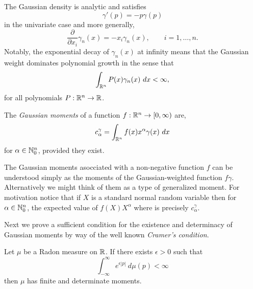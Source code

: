 The Gaussian density is analytic and satisfies
\[
  \gamma'(p) = -p\gamma(p)
\]
in the univariate case and more generally,
\[
  \frac{\partial}{\partial x_i} \gamma_n(x) = -x_i \gamma_n(x), \qquad i = 1, \ldots, n.
\]
Notably, the exponential decay of $\gamma_n(x)$ at infinity means that the Gaussian weight dominates polynomial growth in the sense that 
\[
  \int_{\mathbb{R}^n} P(x) \gamma_n(x) ~dx < \infty,
\]
for all polynomials $P : \mathbb{R}^n \to \mathbb{R}$.




\begin{definition}
  The \textit{Gaussian moments} of a function $f: \mathbb{R}^n \rightarrow [0, \infty)$ are,
  \[
    c^\gamma_\alpha = \int_{\mathbb{R}^n} f(x)x^\alpha \gamma(x) ~dx
  \]
  for $\alpha \in \mathbb{N}_0^n$, provided they exist.
\end{definition}

\begin{remark}
  The Gaussian moments asocciated with a non-negative function $f$ can be understood simply as the moments of the Gaussian-weighted function $f \gamma$. Alternatively we might think of them as a type of generalized moment. For motivation notice that if $X$ is a standard normal random variable then for $\alpha \in \mathbb{N}_0^n$, the expected value of $f(X) X^\alpha$ where is precisely $c_\alpha^\gamma$.
\end{remark}


Next we prove a sufficient condition for the existence and determinacy of Gaussian moments by way of the well known \emph{Cramer's condition}.

\begin{proposition}

  Let $\mu$ be a Radon measure on $\mathbb{R}$. If there exists $\epsilon > 0$ such that
  \[
    \int_{-\infty}^\infty e^{\epsilon |p|} ~d\mu(p) < \infty
  \]
  then $\mu$ has finite and determinate moments.
  
\end{proposition}

